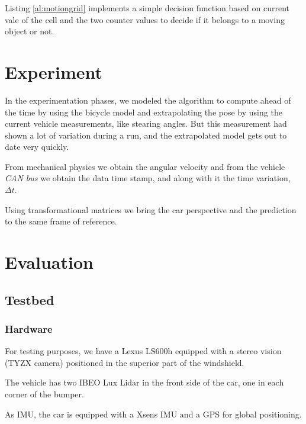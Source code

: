 Listing \ref{al:motiongrid} implements a simple decision function based on current vale of the cell and the two counter values to decide if it belongs to a moving object or not.

\section{Experiment}

In the experimentation phases, we modeled the algorithm to compute ahead of the time by using the bicycle model and extrapolating the pose by using the current vehicle measurements, like stearing angles. But this measurement had shown a lot of variation during a run, and the extrapolated model gets out to date very quickly.

From mechanical physics we obtain the angular velocity and from the vehicle \emph{CAN bus} we obtain the data time stamp, and along with it the time variation, $\Delta t$.

Using transformational matrices we bring the car perspective \cite{iyengar1991autonomous} and the prediction to the same frame of reference.

\section{Evaluation}


\subsection{Testbed}
\label{sec:testbed}

\subsubsection*{Hardware}

For testing purposes, we have a Lexus LS600h equipped with a stereo vision (TYZX camera) positioned in the superior part of the windshield.

The vehicle has two IBEO Lux Lidar in the front side of the car, one in each corner of the bumper.

As IMU, the car is equipped with a Xsens IMU and a GPS for global positioning.

